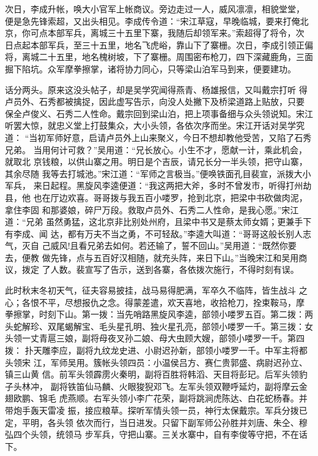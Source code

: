 次日，李成升帐，唤大小官军上帐商议。旁边走过一人，威风凛凛，相貌堂堂，
便是急先锋索超，又出头相见。李成传令道：“宋江草寇，早晚临城，要来打俺北
京，你可点本部军兵，离城三十五里下寨，我随后却领军来。”索超得了将令，次
日点起本部军兵，至三十五里，地名飞虎峪，靠山下了寨栅。次日，李成引领正偏
将，离城二十五里，地名槐树坡，下了寨栅。周围密布枪刀，四下深藏鹿角，三面
掘下陷坑。众军摩拳擦掌，诸将协力同心，只等梁山泊军马到来，便要建功。

话分两头。原来这没头帖子，却是吴学究闻得燕青、杨雄报信，又叫戴宗打听
得卢员外、石秀都被擒捉，因此虚写告示，向没人处撇下及桥梁道路上贴放，只要
保全卢俊义、石秀二人性命。戴宗回到梁山泊，把上项事备细与众头领说知。宋江
听罢大惊，就忠义堂上打鼓集众，大小头领，各依次序而坐。宋江开话对吴学究道：
“当初军师好意，启请卢员外上山来聚义，今日不想却教他受苦，又陷了石秀兄弟。
当用何计可救？”吴用道：“兄长放心。小生不才，愿献一计，乘此机会，就取北
京钱粮，以供山寨之用。明日是个吉辰，请兄长分一半头领，把守山寨，其余尽随
我等去打城池。”宋江道：“军师之言极当。”便唤铁面孔目裴宣，派拨大小军兵，
来日起程。黑旋风李逵便道：“我这两把大斧，多时不曾发市，听得打州劫县，他
也在厅边欢喜。哥哥拨与我五百小喽罗，抢到北京，把梁中书砍做肉泥，拿住李固
和那婆娘，碎尸万段。救取卢员外、石秀二人性命，是我心愿。”宋江道：“兄弟
虽然勇猛，这北京非比别处州府，且梁中书又是蔡太师女婿；更兼手下有李成、闻
达，都有万夫不当之勇，不可轻敌。”李逵大叫道：“哥哥这般长别人志气，灭自
己威风!且看兄弟去如何。若还输了，誓不回山。”吴用道：“既然你要去，便教
做先锋，点与五百好汉相随，就充头阵，来日下山。”当晚宋江和吴用商议，拨定
了人数。裴宣写了告示，送到各寨，各依拨次施行，不得时刻有误。

此时秋末冬初天气，征夫容易披挂，战马易得肥满，军卒久不临阵，皆生战斗
之心；各恨不平，尽想报仇之念。得蒙差遣，欢天喜地，收拾枪刀，拴束鞍马，摩
拳擦掌，时刻下山。第一拨：当先哨路黑旋风李逵，部领小喽罗五百。第二拨：两
头蛇解珍、双尾蝎解宝、毛头星孔明、独火星孔亮，部领小喽罗一千。第三拨：女
头领一丈青扈三娘，副将母夜叉孙二娘、母大虫顾大嫂，部领小喽罗一千。第四拨：
扑天雕李应，副将九纹龙史进、小尉迟孙新，部领小喽罗一千。中军主将都头领宋
江，军师吴用。簇帐头领四员：小温侯吕方、赛仁贵郭盛、病尉迟孙立、镇三山黄
信。前军头领霹雳火秦明，副将百胜将韩滔、天目将彭玘。后军头领豹子头林冲，
副将铁笛仙马麟、火眼狻猊邓飞。左军头领双鞭呼延灼，副将摩云金翅欧鹏、锦毛
虎燕顺。右军头领小李广花荣，副将跳涧虎陈达、白花蛇杨春。并带炮手轰天雷凌
振，接应粮草。探听军情头领一员，神行太保戴宗。军兵分拨已定，平明，各头领
依次而行，当日进发。只留下副军师公孙胜并刘唐、朱仝、穆弘四个头领，统领马
步军兵，守把山寨。三关水寨中，自有李俊等守把，不在话下。

